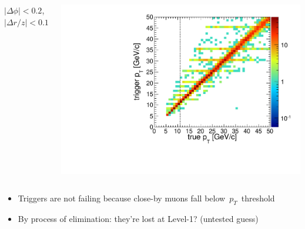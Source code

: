 \documentclass[compress]{beamer}
\begin{document}
\begin{frame}
\begin{columns}
\centering $|\Delta \phi| < 0.2$, $|\Delta r/z| < 0.1$

\includegraphics[width=\linewidth]{trigger_resolution_close.pdf}
\end{columns}

\begin{itemize}
\item Triggers are not failing because close-by muons fall \mbox{below $p_T$ threshold\hspace{-1 cm}}

\item By process of elimination: they're lost at Level-1?  (untested guess)
\end{itemize}
\end{frame}





\end{document}
